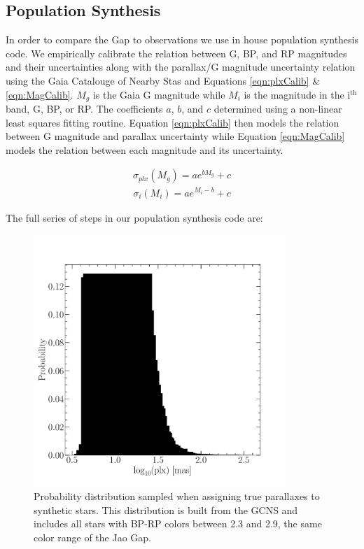 \subsection{Population Synthesis}
In order to compare the Gap to observations we use in house population
synthesis code. We empirically calibrate the relation between G, BP, and RP
magnitudes and their uncertainties along with the parallax/G magnitude
uncertainty relation using the Gaia Catalouge of Nearby Stas
\citep[GCNS,][]{GaiaCollaboration2021} and Equations \ref{eqn:plxCalib} \&
\ref{eqn:MagCalib}. $M_{g}$ is the Gaia G magnitude while $M_{i}$ is the
magnitude in the i$^\text{th}$ band, G, BP, or RP. The coefficients $a$, $b$,
and $c$ determined using a non-linear least squares fitting routine. Equation
\ref{eqn:plxCalib} then models the relation between G magnitude and parallax
uncertainty while Equation \ref{eqn:MagCalib} models the relation between each
magnitude and its uncertainty.

\begin{align}\label{eqn:plxCalib}
	\sigma_{plx}(M_{g}) = ae^{bM_{g}}+c
\end{align}
\begin{align}\label{eqn:MagCalib}
	\sigma_{i}(M_{i}) = ae^{M_{i}-b}+c
\end{align}

\noindent The full series of steps in our population synthesis code
are:

\begin{figure}
	\centering
	\includegraphics[width=0.85\textwidth]{figures/jaoOpacity/pdist.pdf}
	\caption{Probability distribution sampled when assigning true parallaxes to
	synthetic stars. This distribution is built from the GCNS and includes all
	stars with BP-RP colors between 2.3 and 2.9, the same color range
	of the Jao Gap.}
	\label{fig:pdist}
\end{figure}

